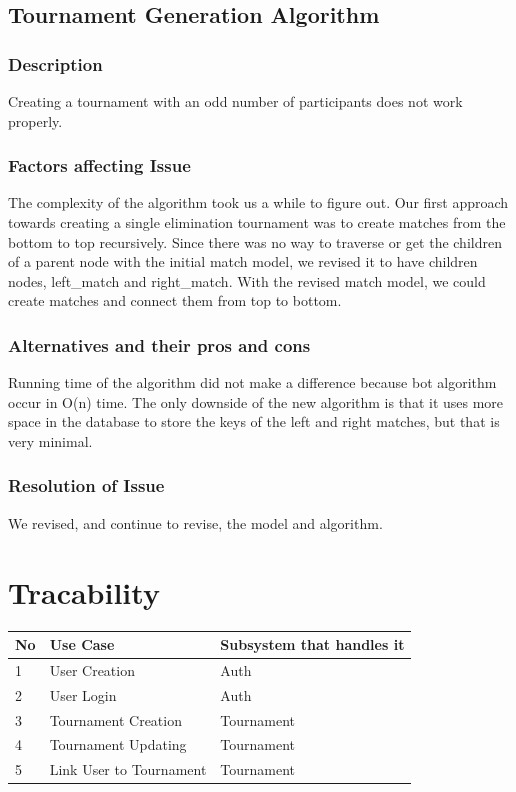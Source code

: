 \documentclass{article}
\begin{document}
\subsection{Tournament Generation Algorithm}
\subsubsection{Description}
Creating a tournament with an odd number of participants does not work properly.

\subsubsection{Factors affecting Issue}
The complexity of the algorithm took us a while to figure out. Our first approach towards creating a single elimination tournament was to create matches from the bottom to top recursively. Since there was no way to traverse or get the children of a parent node with the initial match model, we revised it to have children nodes, left\_match and right\_match. With the revised match model, we could create matches and connect them from top to bottom.

\subsubsection{Alternatives and their pros and cons}
Running time of the algorithm did not make a difference because bot algorithm occur in O(n) time. The only downside of the new algorithm is that it uses more space in the database to store the keys of the left and right matches, but that is very minimal.

\subsubsection{Resolution of Issue}
We revised, and continue to revise, the model and algorithm.



\newpage
\section{Tracability}
\begin{table}[h]
	\centering
	\begin{tabular}{lll}
		\toprule
		No & Use Case & Subsystem that handles it \\
		\midrule
		1 & User Creation & Auth 					\\
		\midrule
		2 & User Login & Auth 					\\
		\midrule
		3 & Tournament Creation & Tournament 		\\
		\midrule
		4 & Tournament Updating & Tournament 		\\
		\midrule
		5 & Link User to Tournament & Tournament  \\
		\bottomrule
	\end{tabular}
\end{table}
\end{document}
